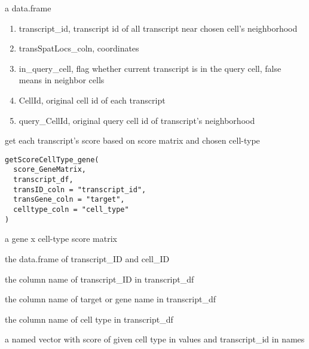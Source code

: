 \documentclass[letterpaper]{book}
\begin{document}
%
\begin{Value}
a data.frame
\begin{enumerate}

\item{} transcript\_id, transcript id of all transcript near chosen cell's neighborhood
\item{} transSpatLocs\_coln, coordinates
\item{} in\_query\_cell, flag whether current transcript is in the query cell, false means in neighbor cells
\item{} CellId, original cell id of each transcript
\item{} query\_CellId, original query cell id of transcript's neighborhood

\end{enumerate}

\end{Value}
%
\begin{Description}
get each transcript's score based on score matrix and chosen cell-type
\end{Description}
%
\begin{Usage}
\begin{verbatim}
getScoreCellType_gene(
  score_GeneMatrix,
  transcript_df,
  transID_coln = "transcript_id",
  transGene_coln = "target",
  celltype_coln = "cell_type"
)
\end{verbatim}
\end{Usage}
%
\begin{Arguments}
\begin{ldescription}
\item[\code{score\_GeneMatrix}] a gene x cell-type score matrix

\item[\code{transcript\_df}] the data.frame of transcript\_ID and cell\_ID

\item[\code{transID\_coln}] the column name of transcript\_ID in transcript\_df

\item[\code{transGene\_coln}] the column name of target or gene name in transcript\_df

\item[\code{celltype\_coln}] the column name of cell type in transcript\_df
\end{ldescription}
\end{Arguments}
%
\begin{Value}
a named vector with score of given cell type in values and transcript\_id in names
\end{Value}
\end{document}
